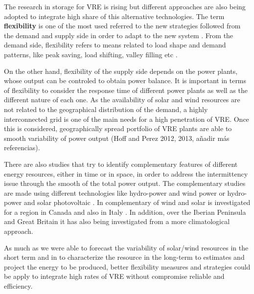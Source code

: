 The research in storage for VRE is rising but different approaches are also being adopted to integrate high share of this alternative technologies. The term \textbf{flexibility} is one of the most used referred to the new strategies followed from the demand and supply side in order to adapt to the new system \cite*{KROPOSKI2017}. From the demand side, flexibility refers to means related to load shape and demand patterns, like peak saving, load shifting, valley filling etc \cite*{Lund2015}.

On the other hand, flexibility of the supply side depends on the power plants, whose output can be controled to obtain power balance. It is important in terms of flexibility to consider the response time of different power plants as well as the different nature of each one. As the availability of solar and wind resources are not related to the geographical distribution of the demand, a highly interconnected grid is one of the main needs for a high penetration of VRE. Once this is considered, geographically spread portfolio of VRE plants are able to smooth variability of power output \cite*{KROPOSKI2017, Marcos2012}(Hoff and Perez 2012, 2013, añadir más referencias).


There are also studies that try to identify complementary features of different energy resources, either in time or in space, in order to address the intermittency issue through the smooth of the total power output. The complementary studies are made using different technologies like hydro-power and wind power \cite*{Denault2009, Silva2016} or hydro-power and solar photovoltaic \cite*{Francois2016, Beluco2012, Kougias2016}. In \cite*{Hoicka2011} complementary of wind and solar is investigated for a region in Canada and also in Italy \cite*{Monforti2014}.  In addition, over the Iberian Peninsula \cite*{Santos-Alamillos2012, Jerez2013b} and Great Britain \cite*{Bett2016} it has also being investigated from a more climatological approach.

As much as we were able to forecast the variability of solar/wind resources in the short term and in to characterize the resource in the long-term to  estimates and project the energy to be produced, better flexibility measures and strategies could be apply to integrate high rates of VRE without compromise reliable and efficiency.

